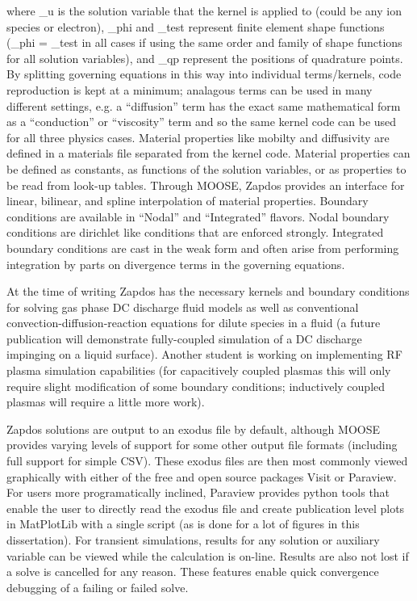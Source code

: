 where \_u is the solution variable that the kernel is applied to (could be any ion species or electron), \_phi and \_test represent finite element shape functions (\_phi = \_test in all cases if using the same order and family of shape functions for all solution variables), and \_qp represent the positions of quadrature points. By splitting governing equations in this way into individual terms/kernels, code reproduction is kept at a minimum; analagous terms can be used in many different settings, e.g. a ``diffusion'' term has the exact same mathematical form as a ``conduction'' or ``viscosity'' term and so the same kernel code can be used for all three physics cases. Material properties like mobilty and diffusivity are defined in a materials file separated from the kernel code. Material properties can be defined as constants, as functions of the solution variables, or as properties to be read from look-up tables. Through MOOSE, Zapdos provides an interface for linear, bilinear, and spline interpolation of material properties. Boundary conditions are available in ``Nodal'' and ``Integrated'' flavors. Nodal boundary conditions are dirichlet like conditions that are enforced strongly. Integrated boundary conditions are cast in the weak form and often arise from performing integration by parts on divergence terms in the governing equations.

At the time of writing Zapdos has the necessary kernels and boundary conditions for solving gas phase DC discharge fluid models as well as conventional convection-diffusion-reaction equations for dilute species in a fluid (a future publication will demonstrate fully-coupled simulation of a DC discharge impinging on a liquid surface). Another student is working on implementing RF plasma simulation capabilities (for capacitively coupled plasmas this will only require slight modification of some boundary conditions; inductively coupled plasmas will require a little more work).

Zapdos solutions are output to an exodus file by default, although MOOSE provides varying levels of support for some other output file formats (including full support for simple CSV). These exodus files are then most commonly viewed graphically with either of the free and open source packages Visit or Paraview. For users more programatically inclined, Paraview provides python tools that enable the user to directly read the exodus file and create publication level plots in MatPlotLib with a single script (as is done for a lot of figures in this dissertation). For transient simulations, results for any solution or auxiliary variable can be viewed while the calculation is on-line. Results are also not lost if a solve is cancelled for any reason. These features enable quick convergence debugging of a failing or failed solve.

